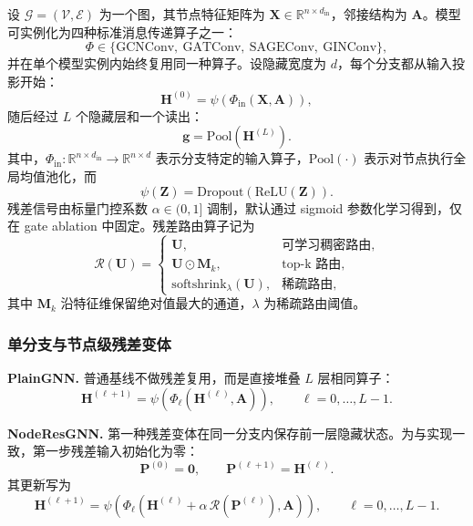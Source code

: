 设 $\mathcal{G}=(\mathcal{V},\mathcal{E})$ 为一个图，其节点特征矩阵为 $\mathbf{X}\in\mathbb{R}^{n\times d_{\mathrm{in}}}$，邻接结构为 $\mathbf{A}$。模型可实例化为四种标准消息传递算子之一：
\[
\Phi \in \{\mathrm{GCNConv},\ \mathrm{GATConv},\ \mathrm{SAGEConv},\ \mathrm{GINConv}\},
\]
并在单个模型实例内始终复用同一种算子。设隐藏宽度为 $d$，每个分支都从输入投影开始：
\begin{equation}
\mathbf{H}^{(0)} = \psi\!\left(\Phi_{\mathrm{in}}(\mathbf{X}, \mathbf{A})\right),
\end{equation}
随后经过 $L$ 个隐藏层和一个读出：
\begin{equation}
\mathbf{g} = \mathrm{Pool}\!\left(\mathbf{H}^{(L)}\right).
\end{equation}
其中，$\Phi_{\mathrm{in}}:\mathbb{R}^{n\times d_{\mathrm{in}}}\rightarrow\mathbb{R}^{n\times d}$ 表示分支特定的输入算子，$\mathrm{Pool}(\cdot)$ 表示对节点执行全局均值池化，而
\begin{equation}
\psi(\mathbf{Z}) = \mathrm{Dropout}\!\left(\mathrm{ReLU}(\mathbf{Z})\right).
\end{equation}
残差信号由标量门控系数 $\alpha\in(0,1]$ 调制，默认通过 sigmoid 参数化学习得到，仅在 gate ablation 中固定。残差路由算子记为
\begin{equation}
\mathcal{R}(\mathbf{U}) =
\begin{cases}
\mathbf{U}, & \text{可学习稠密路由}, \\
\mathbf{U}\odot \mathbf{M}_{k}, & \text{top-k 路由}, \\
\mathrm{softshrink}_{\lambda}(\mathbf{U}), & \text{稀疏路由},
\end{cases}
\end{equation}
其中 $\mathbf{M}_{k}$ 沿特征维保留绝对值最大的通道，$\lambda$ 为稀疏路由阈值。

\subsubsection{单分支与节点级残差变体}

\textbf{PlainGNN.} 普通基线不做残差复用，而是直接堆叠 $L$ 层相同算子：
\begin{equation}
\mathbf{H}^{(\ell+1)} = \psi\!\left(\Phi_{\ell}\!\left(\mathbf{H}^{(\ell)}, \mathbf{A}\right)\right), \qquad \ell=0,\dots,L-1.
\end{equation}

\textbf{NodeResGNN.} 第一种残差变体在同一分支内保存前一层隐藏状态。为与实现一致，第一步残差输入初始化为零：
\begin{equation}
\mathbf{P}^{(0)}=\mathbf{0}, \qquad \mathbf{P}^{(\ell+1)}=\mathbf{H}^{(\ell)}.
\end{equation}
其更新写为
\begin{equation}
\mathbf{H}^{(\ell+1)} = \psi\!\left(\Phi_{\ell}\!\left(\mathbf{H}^{(\ell)} + \alpha\,\mathcal{R}\!\left(\mathbf{P}^{(\ell)}\right), \mathbf{A}\right)\right), \qquad \ell=0,\dots,L-1.
\end{equation}

